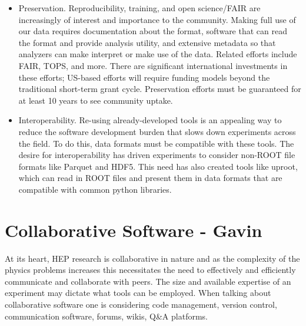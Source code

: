 \begin{itemize}
  \item Preservation.  Reproducibility, training, and open science/FAIR are increasingly of interest and importance to the community.  Making full use of our data requires documentation about the format, software that can read the format and provide analysis utility, and extensive metadata so that analyzers can make interpret or make use of the data.  Related efforts include FAIR, TOPS, and more.  There are significant international investments in these efforts; US-based efforts will require funding models beyond the traditional short-term grant cycle.  Preservation efforts must be guaranteed for at least 10 years to see community uptake.
  \item Interoperability. Re-using already-developed tools is an appealing way to reduce the software development burden that slows down experiments across the field.  To do this, data formats must be compatible with these tools.  The desire for interoperability has driven experiments to consider non-ROOT file formats like Parquet and HDF5.  This need has also created tools like uproot, which can read in ROOT files and present them in data formats that are compatible with common python libraries.
\end{itemize} 



\section{Collaborative Software - Gavin}
\begin{comment}
T. Aarrestad et al. [HEP Software Foundation], “HL-LHC Computing Review: Common Tools and Community Software”, arXiv:2008.13636 [physics.comp-ph ]] (pdf).

Simone Campana, Alessandro Di Girolamo, Paul Laycock, Zach Marshall, Heidi Schellman, Graeme A Stewart. ”HEP computing collaborations for the challenges of the next decade”, arXiv:2203.07237 [physics.comp-ph] (pdf).

Dave Casper, Maria Elena Monzani, Benjamin Nachman, Costas Andreopoulos, Stephen Bailey, Deborah Bard, et al. ”Software and Computing for Small HEP Experiments“, arXiv:2203.07645 [hep-ex] (pdf). (also under EF0, NF0, RF0, CF0)

\end{comment}

At its heart, HEP research is collaborative in nature and as the complexity of the physics problems increases this necessitates the need to effectively and efficiently communicate and collaborate with peers.
The size and available expertise of an experiment may dictate what tools can be employed. When talking about collaborative software one is considering code management, version control, communication software, forums, wikis, Q\&A platforms.
